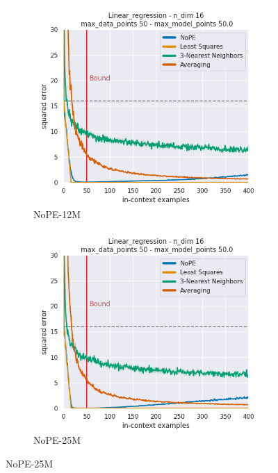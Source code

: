 \documentclass[letterpaper]{article} %
\begin{document}
\begin{figure}[tp]
    \centering
    \begin{subfigure}[t]{0.32\linewidth}
        \includegraphics[width=\linewidth]{AnonymousSubmission/LaTeX/imgs/analysis/small-nope.png}
        \caption{NoPE-12M}
    \end{subfigure}
    \begin{subfigure}[t]{0.32\linewidth}
        \includegraphics[width=\linewidth]{AnonymousSubmission/LaTeX/imgs/experiments/linear-regression/nope.png}
        \caption{NoPE-25M}

\end{subfigure}
\end{figure}
\end{document}
